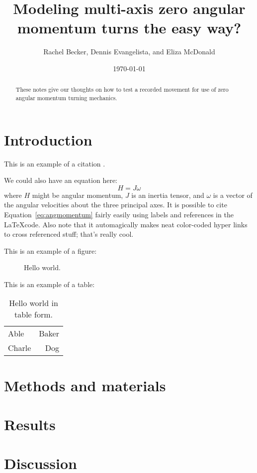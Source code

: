 \documentclass{amsart}
\title{Modeling multi-axis zero angular momentum turns the easy way?}
\author{Rachel Becker, Dennis Evangelista, and Eliza McDonald}
\date{\today}
\begin{document}
\begin{abstract}
These notes give our thoughts on how to test a recorded movement for use of zero angular momentum turning mechanics. 
\end{abstract}
\maketitle
\tableofcontents

\section{Introduction}
This is an example of a citation \cite{Allain:2010, Akaike:1974, R:2011}.

We could also have an equation here:
\begin{equation}
H = J \omega
\label{eq:angmomentum}
\end{equation}
where $H$ might be angular momentum, $J$ is an inertia tensor, and $\omega$ is a vector of the angular velocities about the three principal axes.  It is possible to cite Equation~\ref{eq:angmomentum} fairly easily using labels and references in the \LaTeX code. Also note that it automagically makes neat color-coded hyper links to cross referenced stuff; that's really cool. 

This is an example of a figure:
\begin{figure}
\caption{Hello world.}
\label{fig:hello}
\end{figure}

This is an example of a table:
\begin{table}
\caption{Hello world in table form.}
\label{tab:hello}
\begin{tabular}{lr}
Able & Baker \\
Charle & Dog \\
\end{tabular}
\end{table}




\section{Methods and materials}
\section{Results}
\section{Discussion}



\end{document}
